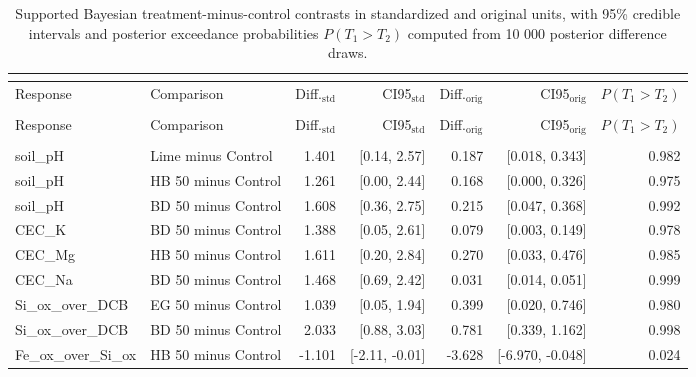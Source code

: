 \documentclass[preprint,12pt]{elsarticle}
\begin{document}
\begin{landscape}
\newpage

\begin{longtable}{@{} >{\raggedright\arraybackslash}p{4.4cm} >{\raggedright\arraybackslash}p{4.0cm} r r r r r @{} }
\caption{Supported Bayesian treatment-minus-control contrasts in standardized and original units, with 95\% credible intervals and posterior exceedance probabilities $P(T_1 > T_2)$ computed from 10 000 posterior difference draws.}\\
\label{tab:geochem_comparisons} \\
\toprule
Response & Comparison & Diff.$_{\text{std}}$ & CI95$_{\text{std}}$ & Diff.$_{\text{orig}}$ & CI95$_{\text{orig}}$ & $P(T_1 > T_2)$ \\
\midrule
\endfirsthead
\multicolumn{7}{c}{{\tablename\ \thetable{} -- continued from previous page}} \\
\toprule
Response & Comparison & Diff.$_{\text{std}}$ & CI95$_{\text{std}}$ & Diff.$_{\text{orig}}$ & CI95$_{\text{orig}}$ & $P(T_1 > T_2)$ \\
\midrule
\endhead
\midrule \multicolumn{7}{r}{{Continued on next page}} \\ \endfoot
\bottomrule \endlastfoot
soil\_\allowbreak{}pH & Lime minus Control & 1.401 & [0.14, 2.57] & 0.187 & [0.018, 0.343] & 0.982 \\
soil\_\allowbreak{}pH & HB 50 minus Control & 1.261 & [0.00, 2.44] & 0.168 & [0.000, 0.326] & 0.975 \\
soil\_\allowbreak{}pH & BD 50 minus Control & 1.608 & [0.36, 2.75] & 0.215 & [0.047, 0.368] & 0.992 \\
CEC\_\allowbreak{}K & BD 50 minus Control & 1.388 & [0.05, 2.61] & 0.079 & [0.003, 0.149] & 0.978 \\
CEC\_\allowbreak{}Mg & HB 50 minus Control & 1.611 & [0.20, 2.84] & 0.270 & [0.033, 0.476] & 0.985 \\
CEC\_\allowbreak{}Na & BD 50 minus Control & 1.468 & [0.69, 2.42] & 0.031 & [0.014, 0.051] & 0.999 \\
Si\_\allowbreak{}ox\_\allowbreak{}over\_\allowbreak{}DCB & EG 50 minus Control & 1.039 & [0.05, 1.94] & 0.399 & [0.020, 0.746] & 0.980 \\
Si\_\allowbreak{}ox\_\allowbreak{}over\_\allowbreak{}DCB & BD 50 minus Control & 2.033 & [0.88, 3.03] & 0.781 & [0.339, 1.162] & 0.998 \\
Fe\_\allowbreak{}ox\_\allowbreak{}over\_\allowbreak{}Si\_\allowbreak{}ox & HB 50 minus Control & -1.101 & [-2.11, -0.01] & -3.628 & [-6.970, -0.048] & 0.024 \\

\end{longtable}
\end{landscape}
\end{document}
